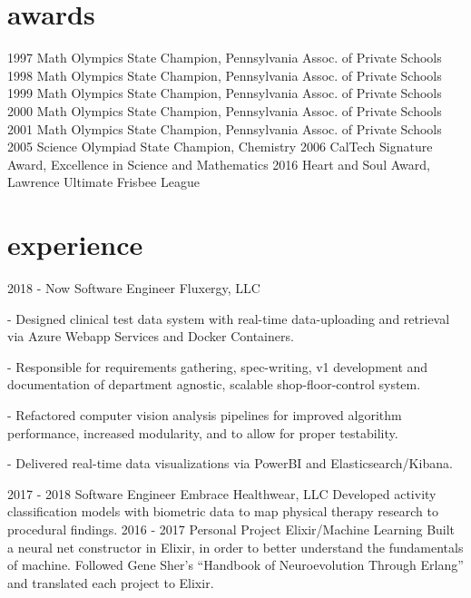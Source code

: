 \documentclass[]{twentysecondcv}
\begin{document}

\section{awards}

\begin{twentyshort}
  \twentyitemshort
    {1997}
    {Math Olympics State Champion, Pennsylvania Assoc. of Private Schools}
  \twentyitemshort
    {1998}
    {Math Olympics State Champion, Pennsylvania Assoc. of Private Schools}
  \twentyitemshort
    {1999}
    {Math Olympics State Champion, Pennsylvania Assoc. of Private Schools}
  \twentyitemshort
    {2000}
    {Math Olympics State Champion, Pennsylvania Assoc. of Private Schools}
  \twentyitemshort
    {2001}
    {Math Olympics State Champion, Pennsylvania Assoc. of Private Schools}
  \twentyitemshort
    {2005}
    {Science Olympiad State Champion, Chemistry}
  \twentyitemshort
    {2006}
    {CalTech Signature Award, Excellence in Science and Mathematics}
  \twentyitemshort
    {2016}
    {Heart and Soul Award, Lawrence Ultimate Frisbee League}
\end{twentyshort}


\section{experience}

\begin{twenty}
  \twentyitem
    {2018 - Now}
    {Software Engineer}
    {Fluxergy, LLC}
    {- Designed clinical test data system with real-time data-uploading and retrieval via Azure Webapp Services and Docker Containers.
	
	- Responsible for requirements gathering, spec-writing, v1 development and documentation of department agnostic, scalable shop-floor-control system.
	
	- Refactored computer vision analysis pipelines for improved algorithm performance, increased modularity, and to allow for proper testability.
	
	- Delivered real-time data visualizations via PowerBI and Elasticsearch/Kibana.}
  \twentyitem
    {2017 - 2018}
    {Software Engineer}
    {Embrace Healthwear, LLC}
    {Developed activity classification models with biometric data to map physical therapy research to procedural findings.} 
  \twentyitem
    {2016 - 2017}
    {Personal Project}
    {Elixir/Machine Learning}
    {Built a neural net constructor in Elixir, in order to better understand the fundamentals of machine. Followed Gene Sher's ``Handbook of Neuroevolution Through Erlang'' and translated each project to Elixir.} 
\end{twenty}
\end{document}
